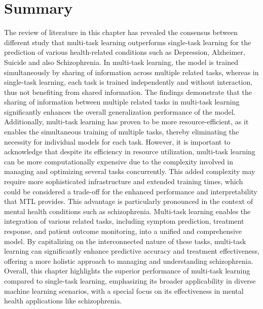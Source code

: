 \section{Summary} 
The review of literature in this chapter has revealed the consensus between different study that multi-task learning outperforms single-task learning for the prediction of various health-related conditions such as Depression, Alzheimer, Suicide and also Schizophrenia. In multi-task learning, the model is trained simultaneously by sharing of information across multiple related tasks, whereas in single-task learning, each task is trained independently and without interaction, thus not benefiting from shared information. The findings demonstrate that the sharing of information between multiple related tasks in multi-task learning significantly enhances the overall generalization performance of the model. Additionally, multi-task learning has proven to be more resource-efficient, as it enables the simultaneous training of multiple tasks, thereby eliminating the necessity for individual models for each task. However, it is important to acknowledge that despite its efficiency in resource utilization, multi-task learning can be more computationally expensive due to the complexity involved in managing and optimizing several tasks concurrently. This added complexity may require more sophisticated infrastructure and extended training times, which could be considered a trade-off for the enhanced performance and interpretability that MTL provides. This advantage is particularly pronounced in the context of mental health conditions such as schizophrenia. Multi-task learning enables the integration of various related tasks, including symptom prediction, treatment response, and patient outcome monitoring, into a unified and comprehensive model. By capitalizing on the interconnected nature of these tasks, multi-task learning can significantly enhance predictive accuracy and treatment effectiveness, offering a more holistic approach to managing and understanding schizophrenia. Overall, this chapter highlights the superior performance of multi-task learning compared to single-task learning, emphasizing its broader applicability in diverse machine learning scenarios, with a special focus on its effectiveness in mental health applications like schizophrenia.

   


\def\baselinestretch{1.66}
\medskip


